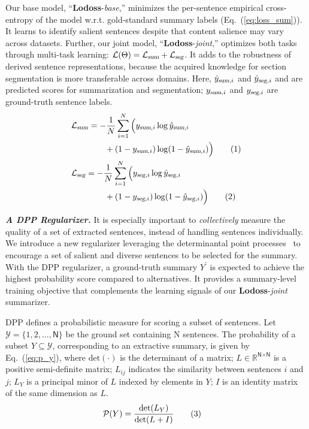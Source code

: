 \documentclass[11pt]{article}
\newcommand\numberthis{\addtocounter{equation}{1}\tag{\theequation}}
\begin{document}
Our base model, ``\textbf{Lodoss}-\emph{base},'' minimizes the per-sentence empirical cross-entropy of the model w.r.t. gold-standard summary labels (Eq.~(\ref{eq:loss_sum})).
It learns to identify salient sentences despite that content salience may vary across datasets.
Further, our joint model, ``\textbf{Lodoss}-\emph{joint},'' optimizes both tasks through multi-task learning: $\mathcal{L}(\Theta) = \mathcal{L}_{\textsl{sum}} + \mathcal{L}_{\textsl{seg}}$.
It adds to the robustness of derived sentence representations, 
because the acquired knowledge for section segmentation is more transferable across domains.
Here, $\hat{y}_{\textsl{sum},i}$ and $\hat{y}_{\textsl{seg},i}$ and are predicted scores for summarization and segmentation; 
$y_{\textsl{sum},i}$ and $y_{\textsl{seg},i}$ are ground-truth sentence labels.
\begin{align*}
& \mathcal{L}_{\textsl{sum}} = - \frac{1}{N} \sum_{i=1}^N \Big( y_{\textsl{sum},i} \log \hat{y}_{\textsl{sum},i} \\   
& \quad\quad\quad\quad + (1-y_{\textsl{sum},i}) \log (1- \hat{y}_{\textsl{sum},i}) \Big)
\numberthis\label{eq:loss_sum}\\
& \mathcal{L}_{\textsl{seg}} = - \frac{1}{N}\sum_{i=1}^N \Big( y_{\textsl{seg},i} \log \hat{y}_{\textsl{seg},i} \\   
& \quad\quad\quad\quad + (1-y_{\textsl{seg},i}) \log (1- \hat{y}_{\textsl{seg},i}) \Big)
\numberthis\label{eq:loss_seg}
\end{align*}

\noindent\textbf{\textsl{A DPP Regularizer.}}\quad
It is especially important to \emph{collectively} measure the quality of a set of extracted sentences, instead of handling sentences individually.
We introduce a new regularizer leveraging the determinantal point processes~\cite{Kulesza:2012,Zhang:2016:DPP,DPPAttn:2021}
to encourage a set of salient and diverse sentences to be selected for the summary.
With the DPP regularizer, a ground-truth summary $Y^{'}$ is expected to achieve the highest probability score compared to alternatives.
It provides a summary-level training objective that complements the learning signals of our \textbf{Lodoss}-\emph{joint} summarizer.


DPP defines a probabilistic measure for scoring a subset of sentences.
Let $\mathcal{Y} = \{1,2,...,\textsf{N}\}$ be the ground set containing \textsf{N} sentences. 
The probability of a subset $Y \subseteq \mathcal{Y}$, corresponding to an extractive summary, is given by Eq.~(\ref{eq:p_y}),
where $\mbox{det}(\cdot)$ is the determinant of a matrix;
$L \in \mathbb{R}^{\textsf{N} \times \textsf{N}}$ is a positive semi-definite matrix; 
$L_{ij}$ indicates the similarity between sentences $i$ and $j$;
$L_Y$ is a principal minor of $L$ indexed by elements in $Y$;
$I$ is an identity matrix of the same dimension as $L$.
\begin{align*}
&\mathcal{P}(Y) = \frac{\mbox{det}(L_Y)}{\mbox{det}(L + I)}
\numberthis\label{eq:p_y}
\end{align*}
\end{document}
